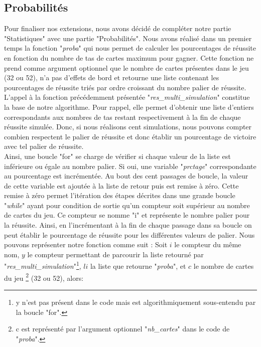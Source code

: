 \documentclass[10pt,a4paper,french,titlepage]{article}
\theoremstyle{definition}
\begin{document}
\subsection{Probabilités}
Pour finaliser nos extensions, nous avons décidé de compléter notre partie "Statistiques" avec une partie "Probabilités". Nous avons réalisé dans un premier temps la fonction "\textit{proba}" qui nous permet de calculer les pourcentages de réussite en fonction du nombre de tas de cartes maximum pour gagner. Cette fonction ne prend comme argument optionnel que le nombre de cartes présentes dans le jeu (32 ou 52), n'a pas d'effets de bord et retourne une liste contenant les pourcentages de réussite triés par ordre croissant du nombre palier de réussite. L'appel à la fonction précédemment présentée "\textit{res\_multi\_simulation}" constitue la base de notre algorithme. Pour rappel, elle permet d'obtenir une liste d'entiers correspondants aux nombres de tas restant respectivement à la fin de chaque réussite simulée.
Donc, si nous réalisons cent simulations, nous pouvons compter combien respectent le palier de réussite et donc établir un pourcentage de victoire avec tel palier de réussite.\\

Ainsi, une boucle "for" se charge de vérifier si chaque valeur de la liste est inférieure ou égale au nombre palier. Si oui, une variable "\textit{prctage}" 
correspondante au pourcentage est incrémentée. Au bout des cent passages de boucle, la valeur de cette variable est ajoutée à la liste de retour puis est remise à zéro. Cette remise à zéro permet l'itération des étapes décrites dans une grande boucle "\textit{while}" ayant pour condition de sortie qu'un compteur soit supérieur au nombre de cartes du jeu. Ce compteur se nomme "i" et représente le nombre palier pour la réussite. Ainsi, en l'incrémentant à la fin de chaque passage dans sa boucle on peut établir le pourcentage de réussite pour les différentes valeurs de palier. Nous pouvons représenter notre fonction comme suit : 
Soit $i$ le compteur du même nom, $y$ le compteur permettant de parcourir la liste retourné par "\textit{res\_multi\_simulation}"\footnote{y n'est pas présent dans le code mais est algorithmiquement sous-entendu par la boucle "for".}, $li$ la liste que retourne "\textit{proba}", et $c$ le nombre de cartes du jeu \footnote{c est représenté par l'argument optionnel "\textit{nb\_cartes}" dans le code de "\textit{proba}".} (32 ou 52), alors:
\end{document}
